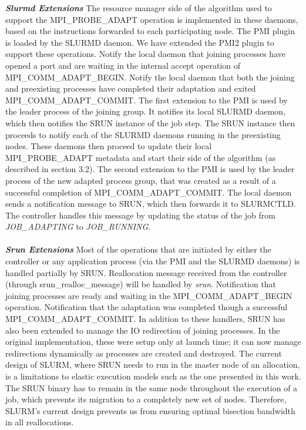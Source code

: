 \textbf{\textit{Slurmd Extensions}} The resource manager side of the algorithm used to support the MPI{\_}PROBE{\_}ADAPT operation is implemented in these daemons, based on the instructions forwarded to each participating node. The PMI plugin is loaded by the SLURMD daemon. We have extended the PMI2 plugin to support these operations. Notify the local daemon that joining processes have opened a port and are waiting in the internal accept operation of MPI{\_}COMM{\_}ADAPT{\_}BEGIN. Notify the local daemon that both the joining and preexisting processes have completed their adaptation and exited MPI{\_}COMM{\_}ADAPT{\_}COMMIT. The first extension to the PMI is used by the leader process of the joining group. It notifies its local SLURMD daemon, which then notifies the SRUN instance of the job step. The SRUN instance then proceeds to notify each of the SLURMD daemons running in the preexisting nodes. These daemons then proceed to update their local MPI{\_}PROBE{\_}ADAPT metadata and start their side of the algorithm (as described in section 3.2). The second extension to the PMI is used by the leader process of the new adapted process group, that was created as a result of a successful completion of MPI{\_}COMM{\_}ADAPT{\_}COMMIT. The local daemon sends a notification message to SRUN, which then forwards it to SLURMCTLD. The controller handles this message by updating the status of the job from \textit{JOB{\_}ADAPTING} to \textit{JOB{\_}RUNNING}.\\ \\
\textbf{\textit{Srun Extensions}} Most of the operations that are initiated by either the controller or any application process (via the PMI and the SLURMD daemons) is handled partially by SRUN. Reallocation message received from the controller (through srun{\_}realloc{\_}message) will be handled by \textit{srun}. Notification that joining processes are ready and waiting in the MPI{\_}COMM{\_}ADAPT{\_}BEGIN operation. Notification that the adaptation was completed though a successful MPI{\_}COMM{\_}ADAPT{\_}COMMIT. In addition to these handlers, SRUN has also been extended to manage the IO redirection of joining processes. In the original implementation, these were setup only at launch time; it can now manage redirections dynamically as processes are created and destroyed. The current design of SLURM, where SRUN needs to run in the master node of an allocation, is a limitations to elastic execution models such as the one presented in this work. The SRUN binary has to remain in the same node throughout the execution of a job, which prevents its migration to a completely new set of nodes. Therefore, SLURM's current design prevents us from ensuring optimal bisection bandwidth in all reallocations.
